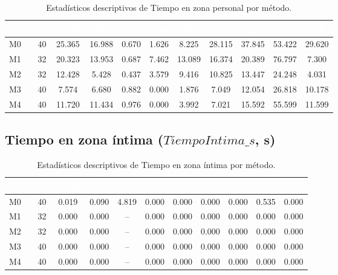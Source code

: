 \documentclass[12pt,a4paper,oneside]{book}
\begin{document}
\begin{table}[H]
\centering
\caption{Estadísticos descriptivos de Tiempo en zona personal por método.}
\renewcommand{\arraystretch}{1.25}
\small
\begin{tabular}{lcccccccccc}
\toprule
\rowcolor{primary}
\textcolor{white}{\textbf{Mét.}} & \textcolor{white}{\textbf{n}} & \textcolor{white}{\textbf{Media}} & \textcolor{white}{\textbf{SD}} & \textcolor{white}{\textbf{CV}} & \textcolor{white}{\textbf{Mín}} & \textcolor{white}{\textbf{Q25}} & \textcolor{white}{\textbf{Med}} & \textcolor{white}{\textbf{Q75}} & \textcolor{white}{\textbf{Máx}} & \textcolor{white}{\textbf{IQR}} \\
\midrule
M0 & 40 & 25.365 & 16.988 & 0.670 & 1.626 & 8.225 & 28.115 & 37.845 & 53.422 & 29.620 \\
M1 & 32 & 20.323 & 13.953 & 0.687 & 7.462 & 13.089 & 16.374 & 20.389 & 76.797 & 7.300 \\
M2 & 32 & 12.428 & 5.428 & 0.437 & 3.579 & 9.416 & 10.825 & 13.447 & 24.248 & 4.031 \\
M3 & 40 & 7.574 & 6.680 & 0.882 & 0.000 & 1.876 & 7.049 & 12.054 & 26.818 & 10.178 \\
M4 & 40 & 11.720 & 11.434 & 0.976 & 0.000 & 3.992 & 7.021 & 15.592 & 55.599 & 11.599 \\
\bottomrule
\end{tabular}
\end{table}

\subsection{Tiempo en zona íntima ($\textit{TiempoIntima\_s}$, s)}

\begin{table}[H]
\centering
\caption{Estadísticos descriptivos de Tiempo en zona íntima por método.}
\renewcommand{\arraystretch}{1.25}
\small
\begin{tabular}{lcccccccccc}
\toprule
\rowcolor{primary}
\textcolor{white}{\textbf{Mét.}} & \textcolor{white}{\textbf{n}} & \textcolor{white}{\textbf{Media}} & \textcolor{white}{\textbf{SD}} & \textcolor{white}{\textbf{CV}} & \textcolor{white}{\textbf{Mín}} & \textcolor{white}{\textbf{Q25}} & \textcolor{white}{\textbf{Med}} & \textcolor{white}{\textbf{Q75}} & \textcolor{white}{\textbf{Máx}} & \textcolor{white}{\textbf{IQR}} \\
\midrule
M0 & 40 & 0.019 & 0.090 & 4.819 & 0.000 & 0.000 & 0.000 & 0.000 & 0.535 & 0.000 \\
M1 & 32 & 0.000 & 0.000 & -- & 0.000 & 0.000 & 0.000 & 0.000 & 0.000 & 0.000 \\
M2 & 32 & 0.000 & 0.000 & -- & 0.000 & 0.000 & 0.000 & 0.000 & 0.000 & 0.000 \\
M3 & 40 & 0.000 & 0.000 & -- & 0.000 & 0.000 & 0.000 & 0.000 & 0.000 & 0.000 \\
M4 & 40 & 0.000 & 0.000 & -- & 0.000 & 0.000 & 0.000 & 0.000 & 0.000 & 0.000 \\
\bottomrule
\end{tabular}
\end{table}
\end{document}
